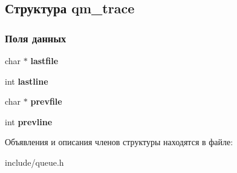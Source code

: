 \hypertarget{structqm__trace}{\subsection{Структура qm\-\_\-trace}
\label{structqm__trace}
}
\subsubsection*{Поля данных}
\begin{DoxyCompactItemize}
\item 
\hypertarget{structqm__trace_a1e66252dcdad11a1c2bd4737e04269dc}{char $\ast$ {\bfseries lastfile}}\label{structqm__trace_a1e66252dcdad11a1c2bd4737e04269dc}

\item 
\hypertarget{structqm__trace_a7028f09829b740ba8774f55a566e803f}{int {\bfseries lastline}}\label{structqm__trace_a7028f09829b740ba8774f55a566e803f}

\item 
\hypertarget{structqm__trace_a09c361b654097d20e2fc1f420d00de3c}{char $\ast$ {\bfseries prevfile}}\label{structqm__trace_a09c361b654097d20e2fc1f420d00de3c}

\item 
\hypertarget{structqm__trace_add6c9645596b959046bd041a20b3ebe1}{int {\bfseries prevline}}\label{structqm__trace_add6c9645596b959046bd041a20b3ebe1}

\end{DoxyCompactItemize}


Объявления и описания членов структуры находятся в файле\-:\begin{DoxyCompactItemize}
\item 
include/queue.\-h\end{DoxyCompactItemize}
